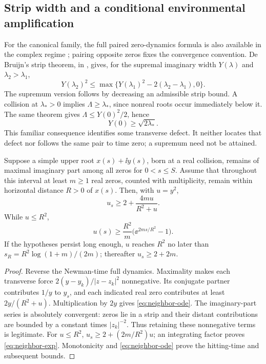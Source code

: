 \subsection{Strip width and a conditional environmental amplification}
For the canonical family, the full paired zero-dynamics formula is
also available in the complex regime
\cite[Proposition~3.1]{Polymath2019}; pairing opposite zeros fixes
the convergence convention. De Bruijn's strip theorem, in
\cite[Theorem~3.2]{Polymath2019}, gives, for the supremal imaginary
width \(Y(\lambda)\) and \(\lambda_2>\lambda_1\),
\begin{equation}\label{eq:strip-contraction}
 Y(\lambda_2)^2\le
 \max\{Y(\lambda_1)^2-2(\lambda_2-\lambda_1),0\}.
\end{equation}
The supremum version follows by decreasing an admissible strip bound.
A collision at \(\lambda_*>0\) implies
\(\Lambda\ge\lambda_*\), since nonreal roots occur immediately below
it. The same theorem gives \(\Lambda\le Y(0)^2/2\), hence
\begin{equation}\label{eq:global-defect}
 Y(0)\ge\sqrt{2\lambda_*}.
\end{equation}
This familiar consequence identifies some transverse defect. It neither
locates that defect nor follows the same pair to time zero; a supremum
need not be attained.

\begin{proposition}\label{prop:neighbor-growth}
Suppose a simple upper root \(x(s)+\ii y(s)\), born at a real collision,
remains of maximal imaginary part among all zeros for \(0<s\le S\).
Assume that throughout this interval at least \(m\ge1\) real zeros,
counted with multiplicity, remain within horizontal distance \(R>0\)
of \(x(s)\). Then, with \(u=y^2\),
\begin{equation}\label{eq:neighbor-ode}
 u_s\ge2+\frac{4mu}{R^2+u}.
\end{equation}
While \(u\le R^2\),
\begin{equation}\label{eq:neighbor-exp}
 u(s)\ge\frac{R^2}{m}\bigl(\ee^{2ms/R^2}-1\bigr).
\end{equation}
If the hypotheses persist long enough, \(u\) reaches \(R^2\) no
later than \(s_R=R^2\log(1+m)/(2m)\); thereafter \(u_s\ge2+2m\).
\end{proposition}
\begin{proof}
Reverse the Newman-time full dynamics. Maximality makes each transverse
force \(2(y-y_k)/|z-z_k|^2\) nonnegative. Its conjugate partner
contributes \(1/y\) to \(y_s\), and each indicated real zero contributes
at least \(2y/(R^2+u)\). Multiplication by \(2y\) gives
\eqref{eq:neighbor-ode}. The imaginary-part series is absolutely
convergent: zeros lie in a strip and their distant contributions are
bounded by a constant times \(|z_k|^{-2}\). Thus retaining these
nonnegative terms is legitimate. For \(u\le R^2\),
\(u_s\ge2+(2m/R^2)u\); an integrating factor proves
\eqref{eq:neighbor-exp}. Monotonicity and
\eqref{eq:neighbor-ode} prove the hitting-time and subsequent bounds.
\end{proof}

